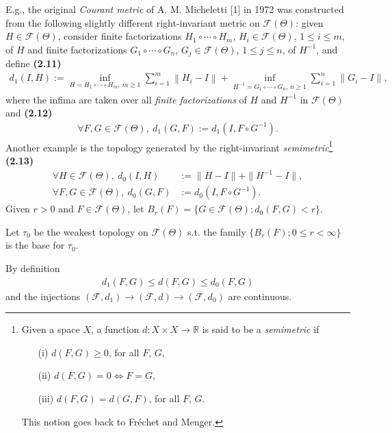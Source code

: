 \documentclass{book}
\numberwithin{equation}{section}
\begin{document}
\begin{enumerate}
    E.g., the original \textit{Courant metric} of A. M. Micheletti [1] in 1972 was constructed from the following slightly different right-invariant metric on $\mathcal{F}(\Theta)$: given $H\in\mathcal{F}(\Theta)$, consider finite factorizations $H_1\circ\cdots\circ H_m$, $H_i\in\mathcal{F}(\Theta)$, $1\le i\le m$, of $H$ and finite factorizations $G_1\circ\cdots\circ G_n$, $G_j\in\mathcal{F}(\Theta)$, $1\le j\le n$, of $H^{-1}$, and define \textbf{(2.11)}
    \begin{align*}
        d_1(I,H) := \inf_{H = H_1\circ\cdots\circ H_m,\ m\ge 1} \sum_{i=1}^m \left\|H_i - I\right\| + \inf_{H^{-1} = G_1\circ\cdots\circ G_n,\, n\ge 1} \sum_{i=1}^n \|G_i - I\|,
    \end{align*}
    where the infima are taken over all \textit{finite factorizations} of $H$ and $H^{-1}$ in $\mathcal{F}(\Theta)$ and \textbf{(2.12)}
    \begin{align*}
        \forall F,G\in\mathcal{F}(\Theta),\ d_1(G,F) := d_1\left(I,F\circ G^{-1}\right).
    \end{align*}
    Another example is the topology generated by the right-invariant \textit{semimetric}\footnote{Given a space $X$, a function $d:X\times X\to\mathbb{R}$ is said to be a \emph{semimetric} if
        \begin{itemize}
            \item[(i)] $d(F,G)\ge 0$, for all $F$, $G$,
            \item[(ii)] $d(F,G) = 0\Leftrightarrow F = G$,
            \item[(iii)] $d(F,G) = d(G,F)$, for all $F$, $G$.
        \end{itemize}
        This notion goes back to Fréchet and Menger.} \textbf{(2.13)}
    \begin{align*}
        \forall H\in\mathcal{F}(\Theta),\ d_0(I,H) &:= \|H - I\| + \|H^{-1} - I\|,\\
        \forall F,G\in\mathcal{F}(\Theta),\ d_0(G,F) &:= d_0\left(I,F\circ G^{-1}\right).
    \end{align*}
    Given $r > 0$ and $F\in\mathcal{F}(\Theta)$, let $B_r(F) = \{G\in\mathcal{F}(\Theta);d_0(F,G) < r\}$.
    
    Let $\tau_0$ be the weakest topology on $\mathcal{F}(\Theta)$ s.t. the family $\{B_r(F);0\le r < \infty\}$ is the base for $\tau_0$.
    
    By definition
    \begin{align*}
        d_1(F,G)\le d(F,G)\le d_0(F,G)
    \end{align*}
    and the injections $(\mathcal{F},d_1)\to(\mathcal{F},d)\to(\mathcal{F},d_0)$ are continuous.
    

\end{enumerate}
\end{document}
